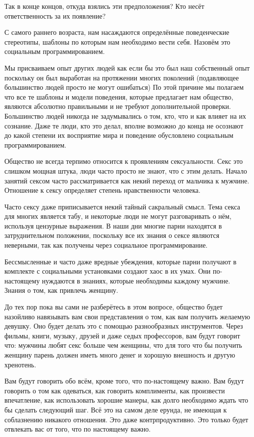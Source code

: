 Так в конце концов, откуда взялись эти предположения? Кто несёт ответственность за их появление?

С самого раннего возраста, нам насаждаются определённые поведенческие стереотипы, шаблоны по которым нам необходимо вести себя. Назовём это социальным программированием.

Мы присваиваем опыт других людей как если бы это был наш собственный опыт поскольку он был выработан на протяжении многих поколений (подавляющее большинство людей просто не могут ошибаться) По этой причине мы полагаем что все те шаблоны и модели поведения, которые предлагает нам общество, являются абсолютно правильными и не требуют дополнительной проверки. Большинство людей никогда не задумывались о том, кто, что и как влияет на их сознание. Даже те люди, кто это делал, вполне возможно до конца не осознают до какой степени их восприятие мира и поведение обусловлено социальным программированием.

Общество не всегда терпимо относится к проявлениям сексуальности. Секс это слишком мощная штука, люди часто просто не знают, что с этим делать. Начало занятий сексом часто рассматривается как некий переход от мальчика к мужчине. Отношение к сексу определяет степень нравственности человека.

Часто сексу даже приписывается некий тайный сакральный смысл. Тема секса для многих является табу, и некоторые люди не могут разговаривать о нём, используя цензурные выражения. В наши дни многие парни находятся в затруднительном положении, поскольку все их знания о сексе являются неверными, так как получены через социальное программирование.

Бессмысленные и часто даже вредные убеждения, которые парни получают в комплекте с социальными установками создают хаос в их умах. Они по-настоящему нуждаются в знаниях, которые необходимы каждому мужчине. Знания о том, как привлечь женщину.

До тех пор пока вы сами не разберётесь в этом вопросе, общество будет назойливо навязывать вам свои представления о том, как вам получить желаемую девушку. Оно будет делать это с помощью разнообразных инструментов. Через фильмы, книги, музыку, друзей и даже седых профессоров, вам будут говорит что: мужчины любят секс больше чем женщины, что для того что бы получить женщину парень должен иметь много денег и хорошую внешность и другую хренотень.

Вам будут говорить обо всём, кроме того, что по-настоящему важно. Вам будут говорить о том как одеваться, как говорить комплименты, как произвести впечатление, как использовать хорошие манеры, как долго необходимо ждать что бы сделать следующий шаг. Всё это на самом деле ерунда, не имеющая к соблазнению никакого отношения. Это даже контрпродуктивно. Это только будет отвлекать вас от того, что по настоящему важно.

